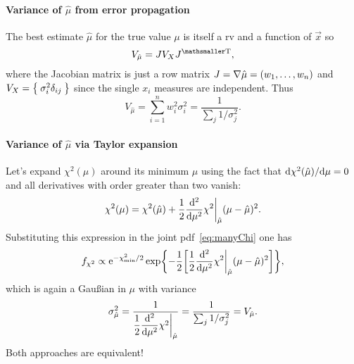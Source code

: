 \documentclass[
	10pt,
	draft
]{scrreprt}
\newcommand{\transpose}[1]{\ensuremath{#1}^{\mathrm{ \mathsmaller T}}}
\newcommand{\eu}{\ensuremath{\mathrm{e}}}
\newcommand{\deriv}[3][]{\dfrac{\ud^{#1}#2}{\ud #3^{#1}}}%
\begin{document}
\paragraph{Variance of $\hat\mu$ from error propagation}

The best estimate $\hat\mu$ for the true value $\mu$ is itself a \ac{rv} and a function of $\vec{x}$ so
\begin{equation}
V_{\hat\mu} = JV_X\transpose{J},
\end{equation}
where the Jacobian matrix is just a row matrix $J = \mathop{}\!\nabla \hat\mu = (w_1,\dots,w_n)$ and $V_X = \Set{\sigma_i^2\delta_{ij}}$ since the single $x_i$ measures are independent.
Thus
\begin{equation}
V_{\hat\mu} = \sum_{i=1}^n w_i^2\sigma_i^2 = \frac{1}{\sum_j 1/\sigma_j^2}.
\end{equation}


\paragraph{Variance of $\hat\mu$ via Taylor expansion}
Let's expand $\chi^2(\mu)$ around its minimum $\hat\mu$ using the fact that $\mathop{}\!\mathrm{d}\chi^2(\hat\mu)/\!\mathop{}\!\mathrm{d}\mu = 0$ and all derivatives with order greater than two vanish:
\begin{equation}
\chi^2(\mu) = \chi^2(\hat\mu) +\frac{1}{2} \deriv[2]{}{\mu}\chi^2\bigg\rvert_{\hat\mu}(\mu-\hat\mu)^2.
\end{equation}\label{eq:chiSquareExpansion}
Substituting this expression in the joint \ac{pdf}~\eqref{eq:manyChi} one has
\begin{equation}
f_{\chi^2} \propto \eu^{-\chi^2_{\textup{min}}/2}\exp\biggl\{ -\frac{1}{2} \biggl[\frac{1}{2} \deriv[2]{}{\mu}\chi^2\bigg\rvert_{\hat\mu}(\mu-\hat\mu)^2\biggr]\biggr\},
\end{equation}
which is again a Gau\ss{}ian in $\mu$ with variance
\begin{equation}
\sigma^2_{\hat\mu} = \frac{1}{\dfrac{1}{2} \deriv[2]{}{\mu}\chi^2\bigg\rvert_{\hat\mu}} = \frac{1}{\sum_j 1/\sigma_j^2}   = V_{\hat\mu}.
\end{equation}
Both approaches are equivalent!
\end{document}
